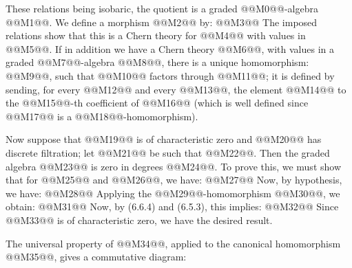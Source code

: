 These relations being isobaric, the quotient is a graded @@M0@@-algebra @@M1@@. We define a morphism @@M2@@ by:
@@M3@@
The imposed relations show that this is a Chern theory for @@M4@@ with values in @@M5@@. If in addition we have a Chern theory @@M6@@, with values in a graded @@M7@@-algebra @@M8@@, there is a unique homomorphism: @@M9@@, such that @@M10@@ factors through @@M11@@; it is defined by sending, for every @@M12@@ and every @@M13@@, the element @@M14@@ to the @@M15@@-th coefficient of @@M16@@ (which is well defined since @@M17@@ is a @@M18@@-homomorphism).

Now suppose that @@M19@@ is of characteristic zero and @@M20@@ has discrete filtration; let @@M21@@ be such that @@M22@@. Then the graded algebra @@M23@@ is zero in degrees @@M24@@. To prove this, we must show that for @@M25@@ and @@M26@@, we have:
@@M27@@
Now, by hypothesis, we have:
@@M28@@
Applying the @@M29@@-homomorphism @@M30@@, we obtain:
@@M31@@
Now, by (6.6.4) and (6.5.3), this implies:
@@M32@@
Since @@M33@@ is of characteristic zero, we have the desired result.

The universal property of @@M34@@, applied to the canonical homomorphism @@M35@@, gives a commutative diagram:
